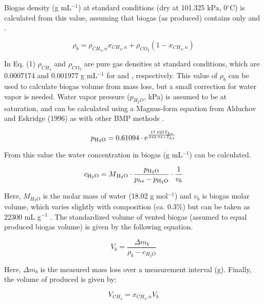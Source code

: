 \documentclass[]{article}
\begin{document}
Biogas density (g mL$^{-1}$) at standard conditions (dry at 101.325 kPa, 0$^\circ$C) is calculated from this value, assuming that biogas (as produced) contains only  and .

\begin{equation}
  \label{eq:dens1}
  \rho_b = \rho_{CH_4,n} x_{CH_4,n} + \rho_{CO_2} (1 - x_{CH_4,n})
\end{equation}

In Eq. (1) $\rho_{CH_4}$ and $\rho_{CO_2}$ are pure gas densities at standard conditions, which are 0.0007174 and 0.001977 g mL$^{-1}$ for  and , respectively.
This value of $\rho_b$ can be used to calculate biogas volume from mass loss, but a small correction for water vapor is needed.
Water vapor pressure ($p_{H_2O}$, kPa) is assumed to be at saturation, and can be calculated using a Magnus-form equation from Alduchov and Eskridge (1996) as with other BMP methods \cite{bmpmethods}.

\begin{equation}
\label{eq:magnus}
   p\textsubscript{H$_2$O} = 0.61094 \cdot e^{\frac{17.625 T_{hs}}{243.04 + T_{hs}}}
\end{equation}

From this value the water concentration in biogas (g mL$^{-1}$) can be calculated.

\begin{equation}
  \label{eq:ch2o}
  c\textsubscript{H$_2$O}=M\textsubscript{H$_2$O} \cdot \frac{p\textsubscript{H$_2$O}}{p_{hs} - p\textsubscript{H$_2$O}} \cdot \frac{1}{v_b}
\end{equation}

Here, $M_{H_2O}$ is the molar mass of water (18.02 g mol$^{-1}$) and $v_b$ is biogas molar volume, which varies slightly with composition (ca. 0.3\%) but can be taken as 22300 mL g$^{-1}$ \cite{validation}.
The standardized volume of vented biogas (assumed to equal produced biogas volume) is given by the following equation.

\begin{equation}
  \label{eq:vb1}
  V_b = \frac{\Delta m_b}{\rho_b - c_{H_2O}}
\end{equation}

Here, $\Delta m_b$ is the measured mass loss over a measurement interval (g).
Finally, the volume of  produced is given by:

\begin{equation}
  \label{eq:vch41}
  V_{CH_4} = x_{CH_4, n} V_b
\end{equation}
\end{document}
